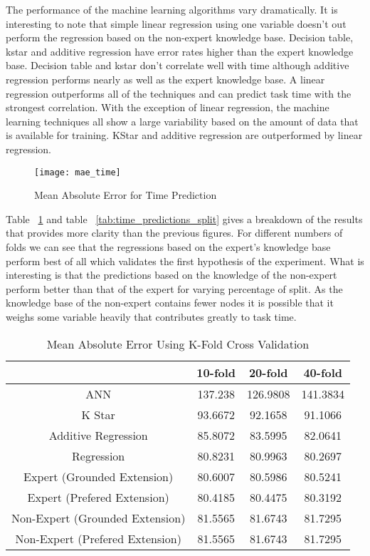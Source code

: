 The performance of the machine learning algorithms vary dramatically. It is interesting to note that simple linear regression using one variable doesn't out perform the regression based on the non-expert knowledge base. Decision table, kstar and additive regression have error rates higher than the expert knowledge base. Decision table and kstar don't correlate well with time although additive regression performs nearly as well as the expert knowledge base. A linear regression outperforms all of the techniques and can predict task time with the strongest correlation. With the exception of linear regression, the machine learning techniques all show a large variability based on the amount of data that is available for training. KStar and additive regression are outperformed by linear regression. 

\begin{figure}[!h]
\centering
\texttt{[image: mae\_time]}
\caption{Mean Absolute Error for Time Prediction}
\label{fig:mae_time}
\end{figure}

Table ~\ref{tab:time_predictions_fold} and table ~\ref{tab:time_predictions_split} gives a breakdown of the results that provides more clarity than the previous figures. For different numbers of folds we can see that the regressions based on the expert's knowledge base perform best of all which validates the first hypothesis of the experiment. What is interesting is that the predictions based on the knowledge of the non-expert perform better than that of the expert for varying percentage of split. As the knowledge base of the non-expert contains fewer nodes it is possible that it weighs some variable heavily that contributes greatly to task time.

\begin{table}[!htbp]
\centering
\begin{tabular}{|c|c|c|c|}
\hline
                                &  10-fold & 20-fold & 40-fold \\ \hline
ANN                             & 137.238 & 126.9808 & 141.3834 \\
K Star                          & 93.6672 & 92.1658 & 91.1066 \\
Additive Regression             & 85.8072  & 83.5995  & 82.0641 \\
Regression                      & 80.8231 & 80.9963 & 80.2697 \\
Expert (Grounded Extension)     & 80.6007 & 80.5986 & 80.5241 \\
Expert (Prefered Extension)     & 80.4185 & 80.4475 &  80.3192 \\
Non-Expert (Grounded Extension) & 81.5565 & 81.6743 & 81.7295 \\
Non-Expert (Prefered Extension) & 81.5565 & 81.6743 & 81.7295 \\
\hline
\end{tabular}
\caption{Mean Absolute Error Using K-Fold Cross Validation}
\label{tab:time_predictions_fold}
\end{table}

